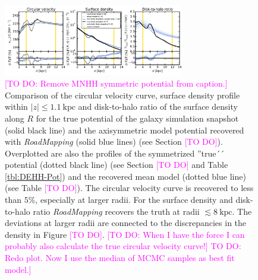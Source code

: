 \documentclass[iop,revtex4,numberedappendix,appendixfloats]{emulateapj}
\newcommand{\RM}{{\sl RoadMapping}}
\newcommand{\Wilma}[1]{\textcolor{Magenta}{#1}}
\begin{document}
\begin{figure}[!htbp]
\centering
\includegraphics[width=0.7\textwidth]{fig/MNdHHdiffSph2_4kpc8Spiral_a_test1_vcirc_surfdens_overview.pdf}
\caption{\Wilma{[TO DO: Remove MNHH symmetric potential from caption.]} Comparison of the circular velocity curve, surface density profile within $|z|\leq1.1~\text{kpc}$ and disk-to-halo ratio of the surface density along $R$ for the true potential of the galaxy simulation snapshot (solid black line) and the axisymmetric model potential recovered with \RM{} (solid blue lines) (see Section \Wilma{[TO DO]}). Overplotted are also the profiles of the symmetrized ''true´´ potential (dotted black line) (see Section \Wilma{[TO DO]} and Table \ref{tbl:DEHH-Pot}) and the recovered mean model (dotted blue line) (see Table \Wilma{[TO DO]}). The circular velocity curve is recovered to less than $5\%$, especially at larger radii. For the surface density and disk-to-halo ratio \RM{} recovers the truth at radii $\lesssim 8~\text{kpc}$. The deviations at larger radii are connected to the discrepancies in the density in Figure \Wilma{[TO DO]}. \Wilma{[TO DO: When I have the force I can probably also calculate the true circular velocity curve!]} \Wilma{TO DO: Redo plot. Now I use the median of MCMC samples as best fit model.]}}
\label{fig:???}
\end{figure}
\end{document}
